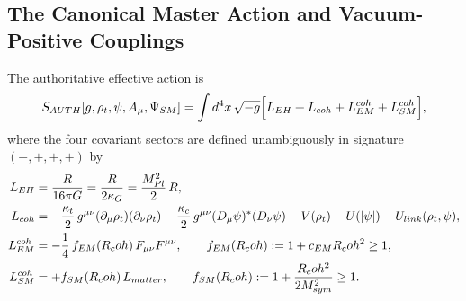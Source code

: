 \subsection{The Canonical Master Action and Vacuum-Positive Couplings}

The authoritative effective action is
\begin{equation}
S_{\mathrm{AUTH}}[g,\rho_t,\psi,A_\mu,\Psi_{\mathrm{SM}}]
= \int d^4x\,\sqrt{-g}\Bigl[
  \mathcal{L}_{\mathrm{EH}}
  + \mathcal{L}_{\mathrm{coh}}
  + \mathcal{L}_{\mathrm{EM}}^{\mathrm{coh}}
  + \mathcal{L}_{\mathrm{SM}}^{\mathrm{coh}}
\Bigr],
\label{eq:canonical_action_sec5}
\end{equation}
where the four covariant sectors are defined unambiguously in signature $(-,+,+,+)$ by
\begin{align}
\mathcal{L}_{\mathrm{EH}} &= \frac{R}{16\pi G} = \frac{R}{2\kappa_G} = \frac{M_{\mathrm{Pl}}^2}{2}\,R, \label{eq:L_EH_def}\\
\mathcal{L}_{\mathrm{coh}} &= -\frac{\kappa_t}{2}\,g^{\mu\nu}(\partial_\mu\rho_t)(\partial_\nu\rho_t)
  - \frac{\kappa_c}{2}\,g^{\mu\nu}(D_\mu\psi)^*(D_\nu\psi)
  - V(\rho_t) - U(|\psi|) - U_{\mathrm{link}}(\rho_t,\psi), \label{eq:L_coh_def}\\
\mathcal{L}_{\mathrm{EM}}^{\mathrm{coh}} &= -\frac{1}{4}\,f_{\mathrm{EM}}(\Rcoh)\,F_{\mu\nu}F^{\mu\nu},
  \qquad f_{\mathrm{EM}}(\Rcoh) := 1 + c_{\mathrm{EM}}\Rcoh^2 \ge 1, \label{eq:L_EM_def}\\
\mathcal{L}_{\mathrm{SM}}^{\mathrm{coh}} &= +f_{\mathrm{SM}}(\Rcoh)\,\mathcal{L}_{\mathrm{matter}},
  \qquad f_{\mathrm{SM}}(\Rcoh) := 1 + \frac{\Rcoh^2}{2 M_{\mathrm{sym}}^2} \ge 1. \label{eq:L_SM_def}
\end{align}

